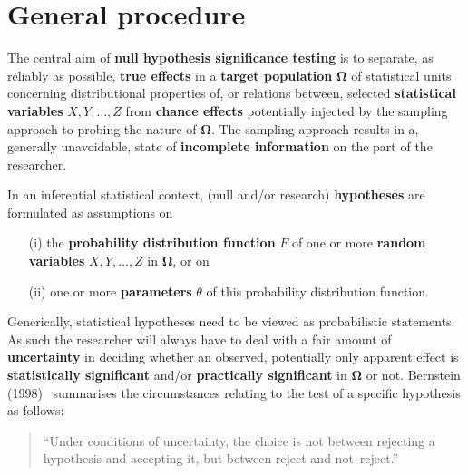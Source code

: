 \section[General procedure]{General procedure}
The central aim of \textbf{null hypothesis significance testing} is
to separate, as reliably as possible, \textbf{true effects} in a
\textbf{target population} $\boldsymbol{\Omega}$ of statistical
units concerning distributional properties of, or relations
between, selected \textbf{statistical variables} $X, Y, \ldots, Z$
from \textbf{chance effects} potentially injected by the sampling
approach to probing the nature of $\boldsymbol{\Omega}$. The
sampling approach results in a, generally unavoidable, state of
\textbf{incomplete information} on the part of the researcher.

\medskip
\noindent
In an inferential statistical context, (null and/or research)
\textbf{hypotheses} are formulated as assumptions on\\[-5mm]
%
\begin{itemize}
\item[(i)] the \textbf{probability distribution function} $F$ of
one or more \textbf{random variables} $X, Y, \ldots, Z$ in 
$\boldsymbol{\Omega}$, or on\\[-5mm]

\item[(ii)] one or more \textbf{parameters} $\theta$ of this
probability distribution function.\\[-5mm]
\end{itemize}
%
Generically, statistical hypotheses need to be viewed as 
probabilistic statements. As such the researcher will always have 
to deal with a fair amount of \textbf{uncertainty} in deciding 
whether an observed, potentially only apparent effect is
\textbf{statistically significant} and/or \textbf{practically
significant} in $\boldsymbol{\Omega}$ or not. Bernstein
(1998)~ summarises the circumstances relating to
the test of a specific hypothesis as follows:
%
\begin{quotation}
``Under conditions of uncertainty, the choice is not between 
rejecting a hypothesis and accepting it, but between reject and 
not--reject.''
\end{quotation}
%

